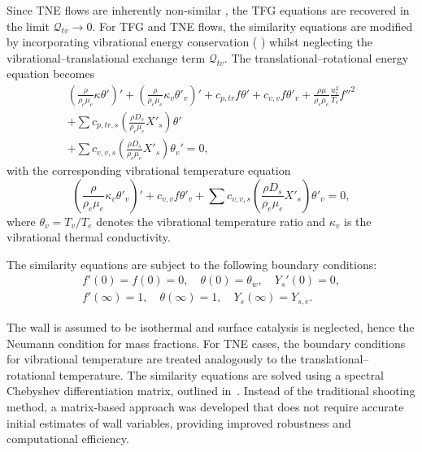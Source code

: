 Since \gls{TNE} flows are inherently non-similar \citep{Anderson2019}, the \gls{TFG} equations are recovered in the limit $\mathcal{Q}_{tv} \to 0$. For \gls{TFG} and \gls{TNE} flows, the similarity equations are modified by incorporating vibrational energy conservation ( ) whilst neglecting the vibrational–translational exchange term $\mathcal{Q}_{tv}$. The translational–rotational energy equation becomes \begin{multline}\label{equation:similarity:tne_energy}
    \left(\frac{\rho}{\rho_e \mu_e} \kappa \theta'\right)' + \left(\frac{\rho}{\rho_e \mu_e} \kappa_v \theta'_v\right)' + c_{p,tr} f \theta' + c_{v,v} f \theta'_{v} + \frac{\rho \mu}{\rho_e \mu_e} \frac{u_{e}^{2}}{T_e} f''^{2} \\
    + \sum c_{p,tr,s} \left(\frac{\rho D_s}{\rho_e \mu_e} X'_s\right) \theta' \\
    + \sum c_{v,v,s} \left(\frac{\rho D_s}{\rho_e \mu_e} X'_s\right) \theta_v' = 0,
\end{multline} with the corresponding vibrational temperature equation \begin{equation}\label{equation:similarity:vibration}
    \left(\frac{\rho}{\rho_e \mu_e} \kappa_v \theta'_v\right)' + c_{v,v} f \theta'_{v} + \sum c_{v,v,s} \left(\frac{\rho D_s}{\rho_e \mu_e} X'_s\right) \theta'_{v} = 0,
\end{equation} where $\theta_v = T_v/T_e$ denotes the vibrational temperature ratio and $\kappa_v$ is the vibrational thermal conductivity.

The similarity equations are subject to the following boundary conditions:
\begin{gather}\label{eq:bc1}
    f'(0) = f(0) = 0, \quad \theta(0) = \theta_w, \quad Y_s'(0) = 0, \\
    f'(\infty) = 1, \quad \theta(\infty) = 1, \quad Y_s(\infty) = Y_{s,e}.
\end{gather}

The wall is assumed to be isothermal and surface catalysis is neglected, hence the Neumann condition for mass fractions. For \gls{TNE} cases, the boundary conditions for vibrational temperature are treated analogously to the translational--rotational temperature. The similarity equations are solved using a spectral Chebyshev differentiation matrix, outlined in~. Instead of the traditional shooting method, a matrix-based approach was developed that does not require accurate initial estimates of wall variables, providing improved robustness and computational efficiency.

